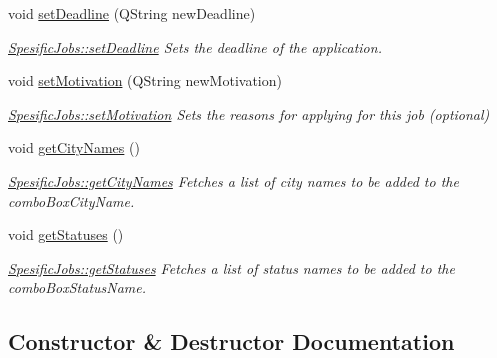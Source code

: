 \begin{DoxyCompactItemize}
void \hyperlink{class_spesific_jobs_a80ceb9ead40dc83e0adcf6ed2b3d5465}{set\+Deadline} (Q\+String new\+Deadline)
\begin{DoxyCompactList}\small\item\em \hyperlink{class_spesific_jobs_a80ceb9ead40dc83e0adcf6ed2b3d5465}{Spesific\+Jobs\+::set\+Deadline} Sets the deadline of the application. \end{DoxyCompactList}\item 
void \hyperlink{class_spesific_jobs_a39df1f364b1ca8e3059094708f01983c}{set\+Motivation} (Q\+String new\+Motivation)
\begin{DoxyCompactList}\small\item\em \hyperlink{class_spesific_jobs_a39df1f364b1ca8e3059094708f01983c}{Spesific\+Jobs\+::set\+Motivation} Sets the reasons for applying for this job (optional) \end{DoxyCompactList}\item 
\mbox{\label{class_spesific_jobs_acbf1efeeb4000a0a1238897daa74085b}} 
void \hyperlink{class_spesific_jobs_acbf1efeeb4000a0a1238897daa74085b}{get\+City\+Names} ()
\begin{DoxyCompactList}\small\item\em \hyperlink{class_spesific_jobs_acbf1efeeb4000a0a1238897daa74085b}{Spesific\+Jobs\+::get\+City\+Names} Fetches a list of city names to be added to the combo\+Box\+City\+Name. \end{DoxyCompactList}\item 
\mbox{\label{class_spesific_jobs_ad1eead4bdf63388b3cbe0bb79b4b0d09}} 
void \hyperlink{class_spesific_jobs_ad1eead4bdf63388b3cbe0bb79b4b0d09}{get\+Statuses} ()
\begin{DoxyCompactList}\small\item\em \hyperlink{class_spesific_jobs_ad1eead4bdf63388b3cbe0bb79b4b0d09}{Spesific\+Jobs\+::get\+Statuses} Fetches a list of status names to be added to the combo\+Box\+Status\+Name. \end{DoxyCompactList}\end{DoxyCompactItemize}


\subsection{Constructor \& Destructor Documentation}
\mbox{\label{class_spesific_jobs_a382c130bb70f2bf25c76ef5c720659d6}} 

